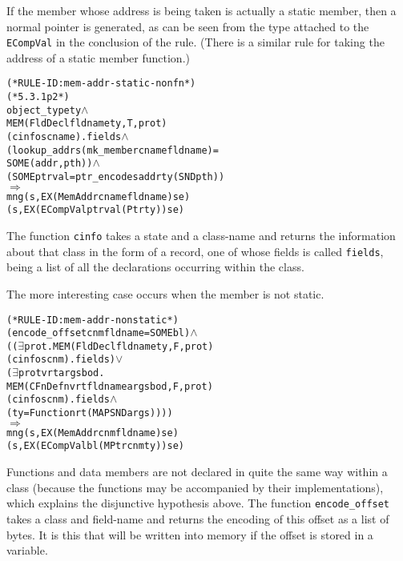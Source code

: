 \documentclass[11pt]{article}
\begin{document}
If the member whose address is being taken is actually a static
member, then a normal pointer is generated, as can be seen from the
type attached to the \texttt{ECompVal} in the conclusion of the rule.
(There is a similar rule for taking the address of a static member
function.)
\begin{center}
%
\begin{minipage}{\textwidth}
\begin{alltt}
(* RULE-ID: mem-addr-static-nonfn *)
(* 5.3.1 p2 *)
     object_type ty \(\land\)
     MEM (FldDecl fldname ty, T, prot)
         (cinfo s cname).fields \(\land\)
     (lookup_addr s (mk_member cname fldname) =
        SOME (addr, pth)) \(\land\)
     (SOME ptrval = ptr_encode s addr ty (SND pth))
   \(\Rightarrow\)
     mng (s, EX (MemAddr cname fldname) se)
         (s, EX (ECompVal ptrval (Ptr ty)) se)
\end{alltt}
\end{minipage}
\end{center}
The function \texttt{cinfo} takes a state and a class-name and returns
the information about that class in the form of a record, one of whose
fields is called \texttt{fields}, being a list of all the declarations
occurring within the class.

\bigskip\noindent
The more interesting case occurs when the member is not static.
%
\begin{alltt}
(* RULE-ID: mem-addr-nonstatic *)
     (encode_offset cnm fldname = SOME bl) \(\land\)
     ((\(\exists\)prot. MEM (FldDecl fldname ty, F, prot)
                  (cinfo s cnm).fields) \(\lor\)
      (\(\exists\)prot v rt args bod.
          MEM (CFnDefn v rt fldname args bod, F, prot)
              (cinfo s cnm).fields \(\land\)
          (ty = Function rt (MAP SND args))))
   \(\Rightarrow\)
     mng (s, EX (MemAddr cnm fldname) se)
         (s, EX (ECompVal bl (MPtr cnm ty)) se)
\end{alltt}
Functions and data members are not declared in quite the same way
within a class (because the functions may be accompanied by their
implementations), which explains the disjunctive hypothesis above.
The function \texttt{encode_offset} takes a class and field-name and
returns the encoding of this offset as a list of bytes.  It is this
that will be written into memory if the offset is stored in a
variable.
\end{document}

